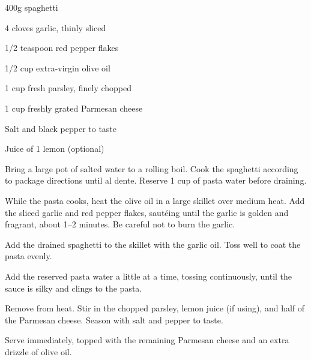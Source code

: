 \documentclass[
    language=english,
    doctype=recipe,
    institution=none,
]{../../omnilatex}
\begin{document}
\newpage


\maketitle

\begin{ingredients}
    \item 400g spaghetti
    \item 4 cloves garlic, thinly sliced
    \item 1/2 teaspoon red pepper flakes
    \item 1/2 cup extra-virgin olive oil
    \item 1 cup fresh parsley, finely chopped
    \item 1 cup freshly grated Parmesan cheese
    \item Salt and black pepper to taste
    \item Juice of 1 lemon (optional)
\end{ingredients}

\begin{instructions}
    \item Bring a large pot of salted water to a rolling boil. Cook the spaghetti according to package directions until al dente. Reserve 1 cup of pasta water before draining.
    \item While the pasta cooks, heat the olive oil in a large skillet over medium heat. Add the sliced garlic and red pepper flakes, saut\'{e}ing until the garlic is golden and fragrant, about 1--2 minutes. Be careful not to burn the garlic.
    \item Add the drained spaghetti to the skillet with the garlic oil. Toss well to coat the pasta evenly.
    \item Add the reserved pasta water a little at a time, tossing continuously, until the sauce is silky and clings to the pasta.
    \item Remove from heat. Stir in the chopped parsley, lemon juice (if using), and half of the Parmesan cheese. Season with salt and pepper to taste.
    \item Serve immediately, topped with the remaining Parmesan cheese and an extra drizzle of olive oil.
\end{instructions}

\end{document}

